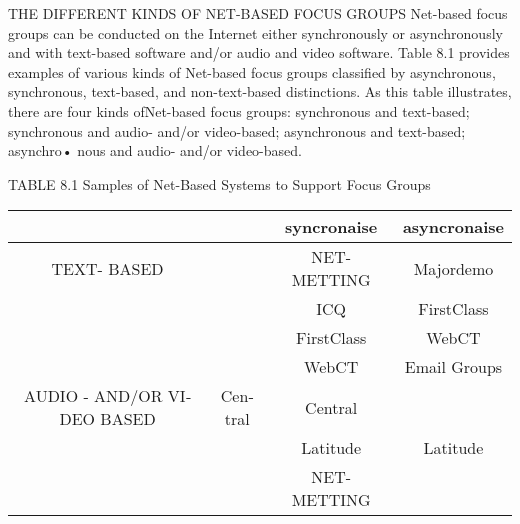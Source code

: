 \documentclass[a4 paper,12pt]{article}\usepackage{xepersian}
\begin{document}
\begin{latin}
\vspace{0.1cm}
THE DIFFERENT  KINDS OF NET-BASED  FOCUS GROUPS
\vspace{0.1cm}
\vspace{0.1cm}
\noindent
Net-based focus groups  can be conducted on  the Internet either  synchronously or asynchronously and with text-based  software and/or audio and video software. Table
8.1  provides   examples  of various  kinds  of Net-based  focus  groups   classified  by asynchronous, synchronous, text-based,  and non-text-based distinctions. As this table illustrates, there are four kinds ofNet-based focus groups: synchronous and text-based; synchronous and audio- and/or video-based; asynchronous and text-based; asynchro• nous and audio- and/or video-based. 


\vspace{0.1cm}


  

\vspace{0.1cm}

\vspace{0.1cm}


\vspace{0.1cm}

\vspace{0.1cm}

TABLE 8.1 Samples of Net-Based Systems to Support Focus  Groups\\
\begin{tabular}{cccc}\hline
                      &                             &syncronaise      & asyncronaise\\\hline
TEXT- BASED &                             & NET- METTING & Majordemo    \\\hline 
                      &                             &     ICQ              & FirstClass       \\\hline
                      &                             & FirstClass         & WebCT            \\\hline
                      &                             &   WebCT           & Email Groups    \\\hline 
AUDIO - AND/OR VIDEO BASED   &   Central           & Central             \\\hline
                      &                             &   Latitude          &   Latitude            \\\hline
                      &                             &  NET-METTING  &                            \\\hline




\end{tabular}
\end{latin}
\end{document}
